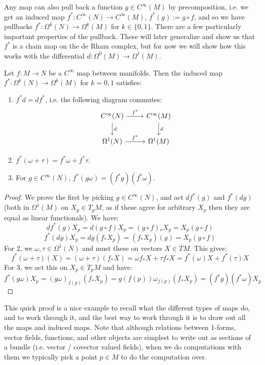 Any map can also pull back a function $g\in C^\infty(M)$ by precomposition, i.e. we get an induced map $f^* : C^\infty(N)
\rightarrow C^\infty(M)$, $f^*(g) := g\circ f$, and so we have pullbacks $f^* : \Omega^k(N)\rightarrow\Omega^k(M)$ for $k\in 
\{0, 1\}$. There are a few particularly important properties of the pullback. These will later generalize and show us that $f^*$ is 
a chain map on the de Rham complex, but for now we will show how this works with the differential $d : \Omega^0(M)
\rightarrow \Omega^1(M)$. 
\begin{theorem}
	Let $f : M\rightarrow N$ be a $C^\infty$ map between manifolds. Then the induced map $f^* : \Omega^k(N)\rightarrow 
	\Omega^k(M)$ for $k = 0, 1$ satisfies:
	\begin{enumerate}
		\item $f^* d = df^*$, i.e. the following diagram commutes:
		\begin{equation}\begin{tikzcd}
			C^\infty(N)\arrow[r, "f^*"]\arrow[d, "d"] & C^\infty(M) \arrow[d, "d"] \\
			\Omega^1(N)\arrow[r, "f^*"] & \Omega^1(M)
		\end{tikzcd}\end{equation}
		\item $f^*(\omega + \tau) = f^*\omega + f^*\tau$.
		\item For $g\in C^\infty(N)$, $f^*(g\omega) = (f^*g)(f^*\omega)$. 
	\end{enumerate}
\end{theorem}
\begin{proof}
	We prove the first by picking $g\in C^\infty(N)$, and act $df^*(g)$ and $f^*(dg)$ (both in $\Omega^1(M)$ on $X_p\in T_p 
	M$, as if these agree for arbitrary $X_p$ then they are equal as linear functionals). We have:
	\begin{equation}
		df^*(g) X_p = d(g\circ f) X_p = (g\circ f)_* X_p = X_p(g\circ f)
	\end{equation}
	\begin{equation}
		f^*(dg) X_p = dg(f_* X_p) = (f_*X_p)(g) = X_p(g\circ f)
	\end{equation}
	For 2, we $\omega, \tau\in\Omega^1(N)$ and must these on vectors $X\in TM$. This gives:
	\begin{equation}
		f^*(\omega + \tau)(X) = (\omega + \tau)(f_* X) = \omega f_* X + \tau f_* X = f^*(\omega)X + f^*(\tau) X
	\end{equation}
	For 3, we act this on $X_p\in T_p M$ and have:
	\begin{equation}
		f^*(g\omega) X_p = (g\omega)_{f(p)} (f_* X_p) = g(f(p)) \omega_{f(p)}(f_* X_p) = (f^* g)(f^*\omega) X_p
	\end{equation}
\end{proof}
This quick proof is a nice example to recall what the different types of maps do, and to work through it, and the best 
way to work through it is to draw out all the maps and induced maps. Note that although relations between 1-forms, vector 
fields, functions, and other objects are simplest to write out as sections of a bundle (i.e. vector / covector valued fields), when 
we do computations with them we typically pick a point $p\in M$ to do the computation over. 

